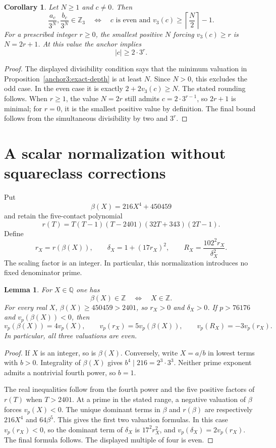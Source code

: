 \documentclass[11pt,a4paper]{article}
\newtheorem{lemma}[theorem]{Lemma}
\newtheorem{corollary}[theorem]{Corollary}
\theoremstyle{definition}
\theoremstyle{remark}
\begin{document}
\begin{corollary}\label{anchor3:integer-cutoff}
Let $N\ge1$ and $c\ne0$.  Then
\[
 \frac{a_c}{3^N},\frac{b_c}{3^N}\in\mathbb Z_3
 \quad\Longleftrightarrow\quad
 c\text{ is even and }v_3(c)\ge\left\lceil\frac N2\right\rceil-1.
\]
For a prescribed integer $r\ge0$, the smallest positive $N$ forcing
$v_3(c)\ge r$ is $N=2r+1$.  At this value the anchor implies
\[
                             |c|\ge2\cdot3^r.
\]
\end{corollary}
\begin{proof}
The displayed divisibility condition says that the minimum valuation in
Proposition~\ref{anchor3:exact-depth} is at least $N$.  Since $N>0$,
this excludes the odd case.  In the even case it is exactly
$2+2v_3(c)\ge N$.  The stated rounding follows.  When $r\ge1$,
the value $N=2r$ still admits $c=2\cdot3^{r-1}$, so $2r+1$ is
minimal; for $r=0$, it is the smallest positive value by definition.
The final bound follows from the simultaneous divisibility by two and
$3^r$.
\end{proof}

\section{A scalar normalization without squareclass corrections}
\label{sec:scalar-correction-free}

Put
\[
                         \beta(X)=216X^4+450459
\]
and retain the five-contact polynomial
\[
 r(T)=T(T-1)(T-2401)(32T+343)(2T-1).
\]
Define
\[
 r_X=r(\beta(X)),\qquad
 \delta_X=1+(17r_X)^2,\qquad
 R_X=\frac{102^2r_X}{\delta_X^2}.
\]
The scaling factor is an integer.  In particular, this normalization
introduces no fixed denominator prime.

\begin{lemma}\label{sn:integral-input}
For $X\in\mathbb Q$ one has
\[
                 \beta(X)\in\mathbb Z
                 \quad\Longleftrightarrow\quad X\in\mathbb Z.
\]
For every real $X$, $\beta(X)\ge450459>2401$, so $r_X>0$
and $\delta_X>0$.  If $p>76176$ and $v_p(\beta(X))<0$,
then
\[
 v_p(\beta(X))=4v_p(X),\qquad
 v_p(r_X)=5v_p(\beta(X)),\qquad
 v_p(R_X)=-3v_p(r_X).
\]
In particular, all three valuations are even.
\end{lemma}
\begin{proof}
If $X$ is an integer, so is $\beta(X)$.  Conversely, write
$X=a/b$ in lowest terms with $b>0$.  Integrality of $\beta(X)$
gives $b^4\mid216=2^3\cdot3^3$.  Neither prime exponent
admits a nontrivial fourth power, so $b=1$.

The real inequalities follow from the fourth power and the
five positive factors of $r(T)$ when $T>2401$.  At a prime
in the stated range, a negative valuation of $\beta$ forces
$v_p(X)<0$.  The unique dominant terms in $\beta$ and
$r(\beta)$ are respectively $216X^4$ and $64\beta^5$.
This gives the first two valuation formulas.  In this case
$v_p(r_X)<0$, so the dominant term of $\delta_X$ is
$17^2r_X^2$, and $v_p(\delta_X)=2v_p(r_X)$.  The final
formula follows.  The displayed multiple of four is even.
\end{proof}
\end{document}
